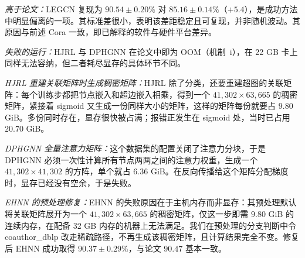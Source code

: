 \documentclass[11pt,a4paper]{article}
\begin{document}
\noindent\textit{高于论文：}LEGCN 复现为 $90.54\pm0.20\%$ 对 $85.16\pm0.14\%$（$+5.4$），是成功方法中明显偏离的一项。其标准差很小，表明该差距稳定且可复现，并非随机波动。其原因与前述 Cora 一致，即已解释的软件与硬件平台差异。

\noindent\textit{失败的运行：}HJRL 与 DPHGNN 在论文中即为 OOM（机制~i），在 22 GB 卡上同样无法容纳，但二者耗尽显存的具体环节不同。

\noindent\textit{HJRL 重建关联矩阵时生成稠密矩阵：}HJRL 除了分类，还要重建超图的关联矩阵：每个训练步都把节点嵌入和超边嵌入相乘，得到一个 $41{,}302\times63{,}665$ 的稠密矩阵，紧接着 sigmoid 又生成一份同样大小的矩阵，这样的矩阵每份就要占 $9.80$ GiB。多份同时存在，显存很快被占满；报错正发生在 sigmoid 处，当时已占用 $20.70$ GiB。

\noindent\textit{DPHGNN 全量注意力矩阵：}这个数据集的配置关闭了注意力分块，于是 DPHGNN 必须一次性计算所有节点两两之间的注意力权重，生成一个 $41{,}302\times41{,}302$ 的方阵，单个就占 $6.36$ GiB。在反向传播给这个矩阵分配梯度时，显存已经没有空余，于是失败。

\noindent\textit{EHNN 的预处理修复：}EHNN 的失败原因在于主机内存而非显存：其预处理默认将关联矩阵展开为一个 $41{,}302\times63{,}665$ 的稠密矩阵，仅这一步即需 $9.80$ GiB 的连续内存，在配备 32 GB 内存的机器上无法满足。我们在预处理的分支判断中令 coauthor\_dblp 改走稀疏路径，不再生成该稠密矩阵，且计算结果完全不变。修复后 EHNN 成功取得 $90.37\pm0.29\%$，与论文 $90.47$ 基本一致。
\end{document}
